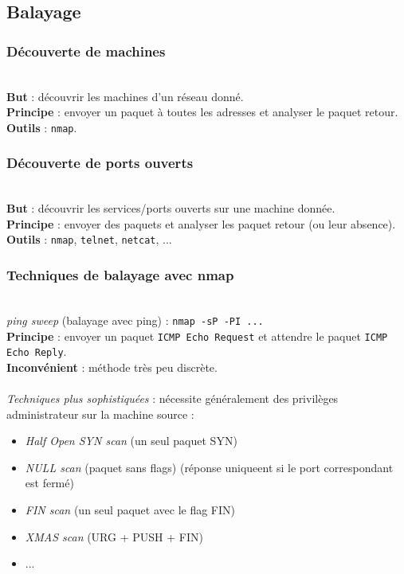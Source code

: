 \documentclass[journal, a4paper]{IEEEtran}
\begin{document}
	\subsection{Balayage}
	
		\subsubsection{Découverte de machines}
		~\\
			\textbf{But} : découvrir les machines d'un réseau donné.\\
			\textbf{Principe} : envoyer un paquet à toutes les adresses et analyser le paquet retour.\\
			\textbf{Outils} : \verb$nmap$.
		~\\
		\subsubsection{Découverte de ports ouverts}
		~\\
			\textbf{But} : découvrir les services/ports ouverts sur une machine donnée.\\
			\textbf{Principe} : envoyer des paquets et analyser les paquet retour (ou leur absence).\\
			\textbf{Outils} : \verb$nmap$, \verb$telnet$, \verb$netcat$, ...
		~\\
		\subsubsection{Techniques de balayage avec nmap}
		~\\
			\textit{ping sweep} (balayage avec ping) : \verb$nmap -sP -PI ...$\\
			\textbf{Principe} : envoyer un paquet \verb$ICMP Echo Request$ et attendre le paquet \verb$ICMP Echo Reply$.\\
			\textbf{Inconvénient} : méthode très peu discrète.\\
			~\\
			\textit{Techniques plus sophistiquées} : nécessite généralement des privilèges administrateur sur la machine source :
			\begin{itemize}
				\item \textit{Half Open SYN scan} (un seul paquet SYN)
				\item \textit{NULL scan} (paquet sans flags) (réponse uniqueent si le port correspondant est fermé)
				\item \textit{FIN scan} (un seul paquet avec le flag FIN)
				\item \textit{XMAS scan} (URG + PUSH + FIN)
				\item ...
			\end{itemize}
		~\\
\end{document}
